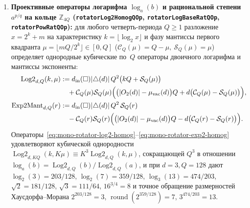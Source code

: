 \begin{theorem}[Сокращение масштаба $A = K\cdot dh$, размерность Хаусдорфа--Морана $D_H = 3$ ячейки Вороного и проективные операторы логарифма $\log_a(b)$ и рациональной степени $a^{p/q}$ на $\mathbb{Z}_{4Q}$]
\begin{enumerate}[label=\textbf{(\arabic*)},leftmargin=*]
  макро-ячейка Вигнера--Зейтца (ромбический додекаэдр с ребром $A = K\cdot dh$) содержит $N_{\mathrm{pack}}(d, K) = K^d$ элементарных ячеек, удовлетворяя закону мультипликативного самоподобия $N_{\mathrm{pack}}(d, K_1 K_2) = N_{\mathrm{pack}}(d, K_1) N_{\mathrm{pack}}(d, K_2)$ с целой размерностью Хаусдорфа--Морана $D_H^{(\mathrm{bulk})} = \ln(K^3)/\ln K = 3$. Если же правила отбора автомата оставляют на шаге масштаба~$K$ активное подмножество $1 < N_{\mathrm{sub}} < K^3$, то $m$-кратная итерация порождает дискретный фрактал с размерностью Хаусдорфа--Морана $D_H = \ln N_{\mathrm{sub}} / \ln K < 3$: октантную губку Канала~2 ($K=2, N_{\mathrm{sub}}=7, D_H = \ln 7/\ln 2 \approx 2{,}807$), кубооктаэдрическую губку $\mathcal{C}_{13}$ в кубе Мура ($K=3, N_{\mathrm{sub}}=13, D_H = \ln 13/\ln 3 \approx 2{,}335$) и сосудистые деревья с ветвлением по квадратной грани $k = d_{\mathrm{in}}(\square) = 4$ и показателем аллометрии Клейбера $(k-1)/k = 3/4$.
\item \textbf{Проективные операторы логарифма $\log_a(b)$ и рациональной степени $a^{p/q}$ на кольце $\mathbb{Z}_{4Q}$ (\texttt{rotatorLog2HomogQOp}, \texttt{rotatorLogBaseRatQOp}, \texttt{rotatorPowRatQOp}):}
  для любого четверть-периода $Q \ge 1$ разложение $x = 2^k + m$ на характеристику $k = \lfloor\log_2 x\rfloor$ и фазу мантиссы первого квадранта $\mu = \lfloor m Q / 2^k\rfloor \in [0, Q]$ ($\mathcal{C}_Q(\mu) = Q - \mu,\ \mathcal{S}_Q(\mu) = \mu$) определяет однородные кубические по~$Q$ операторы двоичного логарифма и мантиссы экспоненты:
  \begin{align}
    \operatorname{Log2}_{d,Q}(k,\mu) &:= d_{\mathrm{in}}(\square) |{\triangle}(d)|\,Q^2\bigl(k Q + \mathcal{S}_Q(\mu)\bigr) \nonumber \\
      &\quad + \mathcal{C}_Q(\mu)\mathcal{S}_Q(\mu)\Bigl(\bigl(|O_2(d)| - \mu_{\mathrm{vac}}(d)\bigr)Q + d\bigl(\mathcal{C}_Q(\mu) - \mathcal{S}_Q(\mu)\bigr)\Bigr), \label{eq:mono-rotator-log2-homog} \\
    \operatorname{Exp2Mant}_{d,Q}(r) &:= d_{\mathrm{in}}(\square) |{\triangle}(d)|\,Q^2\,\mathcal{S}_Q(r) \nonumber \\
      &\quad - \mathcal{C}_Q(r)\mathcal{S}_Q(r)\Bigl(\bigl(|O_2(d)| - \mu_{\mathrm{vac}}(d)\bigr)Q - d\bigl(\mathcal{C}_Q(r) - \mathcal{S}_Q(r)\bigr)\Bigr). \label{eq:mono-rotator-exp2-homog}
  \end{align}
  Операторы~\eqref{eq:mono-rotator-log2-homog}--\eqref{eq:mono-rotator-exp2-homog} удовлетворяют кубической однородности $\operatorname{Log2}_{d,KQ}(k, K\mu) \equiv K^3\operatorname{Log2}_{d,Q}(k,\mu)$, сокращающей $Q^3$ в отношении $\log_a(b) = \operatorname{Log2}_{d,Q}(b)/\operatorname{Log2}_{d,Q}(a)$, и при $d = 3, Q = 128$ дают $\log_2(3) = 203/128$, $\log_2(7) = 359/128$, $\log_3(13) = 474/203$, $\sqrt{2} = 181/128$, $\sqrt{3} = 111/64$, $16^{3/4} = 8$ и точное обращение размерностей Хаусдорфа--Морана $2^{203/128} = 3$, $\operatorname{round}(2^{359/128}) = 7$, $3^{474/203} = 13$.

\end{enumerate}
\end{theorem}
